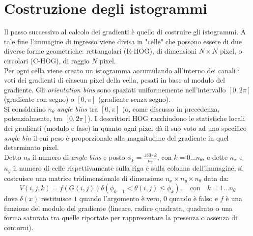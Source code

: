 \section{Costruzione degli istogrammi}
Il passo successivo al calcolo dei gradienti è quello di costruire gli istogrammi. A tale fine l'immagine di ingresso viene divisa in "celle" che possono essere di due diverse forme geometriche: rettangolari (R-HOG), di dimensioni $N\times N $ pixel, o circolari (C-HOG), di raggio $N$ pixel.\\
Per ogni cella viene creato un istogramma accumulando all'interno dei canali i voti dei gradienti di ciascun pixel della cella, pesati in base al modulo del gradiente. 
Gli \emph{orientation bins} sono spaziati uniformemente nell'intervallo $[0, 2\pi]$ (gradiente con segno) o $[0, \pi]$ (gradiente senza segno).\\ 
Si considerino $n_{\theta}$ \emph{angle bins} tra $[0,\pi]$ (o, come discusso in precedenza, potenzialmente, tra $[0,2\pi]$).
I descrittori HOG racchiudono le statistiche locali dei gradienti (modulo e fase) in quanto ogni pixel dà il suo voto ad uno specifico \emph{angle bin} il cui peso è proporzionale alla magnitudine del gradiente in quel determinato pixel. 
\\
Detto $ n_{\theta}$ il numero di \emph{angle bins} e posto ${\phi_{k}}={\frac{180 \cdot k}{n_{\theta}}}$, con $k=0...n_{\theta}$, e dette $n_{x}$ e $n_{y}$ il numero di celle rispettivamente sulla riga e sulla colonna dell'immagine, si costruisce una matrice tridimensionale di dimensione $n_{x}\times n_{y} \times n_{\theta}$ data da:
\begin{equation}
\label{eq:euquazione_matrice_voti}
V(i,j,k)=f(G(i,j))\delta(\phi_{k-1} <\theta(i,j) \leq\phi_{k}), \quad \text{con} \quad k=1...n_{\theta}
\end{equation}
dove $ \delta(x)$ restituisce $1$ quando l'argomento è vero, $0$ quando è falso e $f$ è una funzione del modulo del gradiente (lineare, radice quadrata, quadrato o una forma saturata tra quelle riportate per rappresentare la presenza o assenza di contorni).

